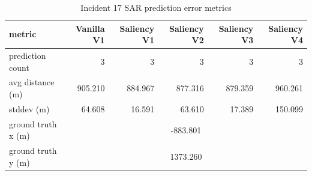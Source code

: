 \begin{table}[ht]
\centering
\caption{Incident 17 SAR prediction error metrics}
\label{tab:sar-incident-17}
\begin{tabular}{lrrrrr}
\hline
metric & Vanilla V1 & Saliency V1 & Saliency V2 & Saliency V3 & Saliency V4 \\
\hline
prediction count & 3 & 3 & 3 & 3 & 3 \\
avg distance (m) & 905.210 & 884.967 & 877.316 & 879.359 & 960.261 \\
stddev (m) & 64.608 & 16.591 & 63.610 & 17.389 & 150.099 \\
ground truth x (m) & \multicolumn{5}{c}{-883.801} \\
ground truth y (m) & \multicolumn{5}{c}{1373.260} \\
\hline
\end{tabular}
\end{table}
